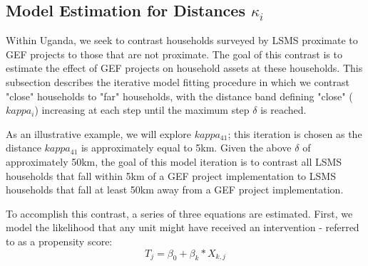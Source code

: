 \documentclass[sustainability,article,submit,moreauthors,pdftex]{Definitions/mdpi}
\begin{document}
\subsection{Model Estimation for Distances $\kappa_{i}$}
Within Uganda, we seek to contrast households surveyed by LSMS proximate to GEF projects to those that are not proximate.  The goal of this contrast is to estimate the effect of GEF projects on household assets at these households.  This subsection describes the iterative model fitting procedure in which we contrast "close" households to "far" households, with the distance band defining "close" ($kappa_{i}$) increasing at each step until the maximum step $\delta$ is reached.
\par
As an illustrative example, we will explore $kappa_{41}$; this iteration is chosen as the distance $kappa_{41}$ is approximately equal to 5km.  Given the above $\delta$ of approximately 50km, the goal of this model iteration is to contrast all LSMS households that fall within 5km of a GEF project implementation to LSMS households that fall at least 50km away from a GEF project implementation.
\par
To accomplish this contrast, a series of three equations are estimated.  First, we model the likelihood that any unit might have received an intervention - referred to as a propensity score:
\begin{equation}
    T_{j} = \beta_{0} + \beta_{k} * X_{k,j}
\end{equation}
\end{document}
